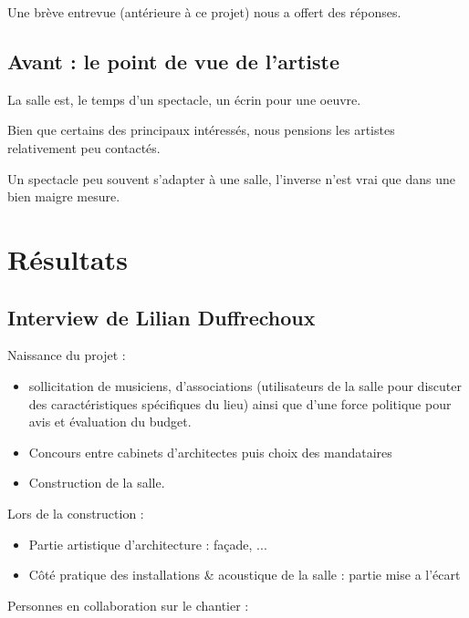 \documentclass[a4paper, 11pt]{report}
\begin{document}
Une brève entrevue (antérieure à ce projet) nous a offert des réponses.

\subsection{Avant : le point de vue de l'artiste}

La salle est, le temps d'un spectacle, un écrin pour une oeuvre.

Bien que certains des principaux intéressés, nous pensions les artistes relativement peu contactés.

Un spectacle peu souvent s'adapter à une salle, l'inverse n'est vrai que dans une bien maigre mesure.


\section{Résultats}

\subsection{Interview de Lilian {\sc Duffrechoux}}

Naissance du projet :

\begin{itemize}
\item sollicitation de musiciens, d'associations (utilisateurs de la salle pour discuter des caractéristiques spécifiques du lieu) ainsi que d'une force politique pour avis et évaluation du budget.
\item Concours entre cabinets d'architectes puis choix des mandataires
\item Construction de la salle.
\end{itemize}

Lors de la construction :

\begin{itemize}
\item Partie artistique d'architecture : façade, ...
\item Côté pratique des installations \& acoustique de la salle : partie mise a l'écart
\end{itemize}

Personnes en collaboration sur le chantier :
\end{document}
